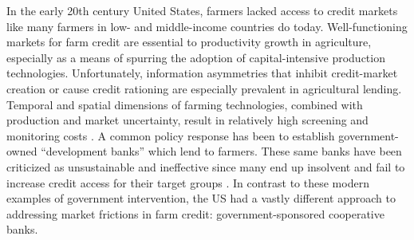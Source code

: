 \documentclass[12pt]{article}
\begin{document}
\newpage
\doublespacing
In the early 20th century United States, farmers lacked access to credit markets like many farmers in low- and middle-income countries do today. 
Well-functioning markets for farm credit are essential to productivity growth in agriculture, especially as a means of spurring the adoption of capital-intensive production technologies. 
Unfortunately, information asymmetries that inhibit credit-market creation or cause credit rationing are especially prevalent in agricultural lending.
 Temporal and spatial dimensions of farming technologies, combined with production and market uncertainty, result in relatively high screening and monitoring costs \citep{hoff_introduction:_1990,carter_equilibrium_1988,stiglitz_credit_1981}. 
 A common policy response has been to establish government-owned ``development banks'' which lend to farmers. 
 These same banks have been criticized as unsustainable and ineffective since many end up insolvent and fail to increase credit access for their target groups \citep{besley_how_1994,hoff_introduction:_1990,braverman1986rural,de_luna-martinez_global_2012,meyer_subsidies_2011}.
 In contrast to these modern examples of government intervention, the US had a vastly different approach to addressing market frictions in farm credit: government-sponsored cooperative banks.
\end{document}
